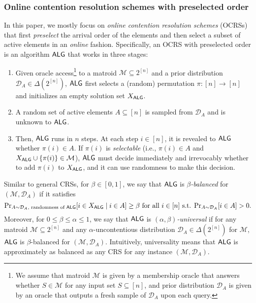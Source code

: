 \documentclass[11pt]{article}
\newcommand{\D}{\mathcal D}
\newcommand{\M}{{\mathcal M}}
\newcommand{\alg}{\textnormal{\sffamily ALG}}
\begin{document}
\subsubsection*{Online contention resolution schemes with preselected order}
In this paper, we mostly focus on \emph{online contention resolution schemes} (OCRSs) that first \emph{preselect} the arrival order of the elements and then select a subset of active elements in an \emph{online} fashion. Specifically, an OCRS with preselected order is an algorithm $\alg$ that works in three stages:
\begin{enumerate}[(1)]
    \item\label{step:select_order} Given oracle access\footnote{We assume that matroid $\M$ is given by a membership oracle that answers whether $S\in\M$ for any input set $S\subseteq[n]$, and prior distribution $\D_A$ is given by an oracle that outputs a fresh sample of $\D_A$ upon each query.} to a matroid $\M\subseteq 2^{[n]}$ and a prior distribution $\D_A\in\Delta(2^{[n]})$, $\alg$ first selects a (random) permutation $\pi:[n]\to[n]$ and initializes an empty solution set $X_{\alg}$.
    \item A random set of active elements $A\subseteq [n]$ is sampled from $\D_A$ and is unknown to $\alg$.
    \item Then, $\alg$ runs in $n$ steps. At each step $i\in[n]$, it is revealed to $\alg$ whether $\pi(i)\in A$. If $\pi(i)$ is \emph{selectable} (i.e., $\pi(i)\in A$ and $X_{\alg}\cup\{\pi(i)\}\in\M$), $\alg$ must decide immediately and irrevocably whether to add $\pi(i)$ to $X_{\alg}$, and it can use randomness to make this decision.
\end{enumerate}

Similar to general CRSs, for $\beta\in[0,1]$, we say that $\alg$ is \emph{$\beta$-balanced} for $(\M,\D_A)$ if it satisfies
\[
    {\Pr}_{A\sim \D_A,\textrm{ randomness of $\alg$}}[i\in X_{\alg}\mid i\in A]\ge \beta \textrm{ for all $i\in[n]$ s.t. }{\Pr}_{A\sim \D_A}[i\in A]>0.
\]
Moreover, for $0\le\beta\le\alpha\le1$, we say that $\alg$ is \emph{$(\alpha,\beta)$-universal} if for any matroid $\M\subseteq 2^{[n]}$ and any $\alpha$-uncontentious distribution $\D_A\in\Delta(2^{[n]})$ for $\M$, $\alg$ is $\beta$-balanced for $(\M,\D_A)$. Intuitively, universality means that $\alg$ is approximately as balanced as any CRS for any instance $(\M,\D_A)$.
\end{document}

